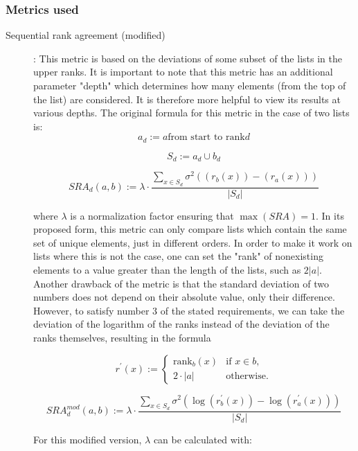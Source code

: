 \subsubsection{Metrics used}

\begin{description}
	\item [Sequential rank agreement (modified)] \cite{ekstromSequentialRankAgreement2015}: This metric is based on the deviations of some subset of the lists in the upper ranks.
	      It is important to note that this metric has an additional parameter "depth" which determines how many elements (from the top of the list) are considered.
	      It is therefore more helpful to view its results at various depths.
	      The original formula for this metric in the case of two lists is:
	      \[
		      a_{d} := a \text{from start to rank} d
	      \]

	      \[
		      S_{d} := a_{d} \cup b_{d}
	      \]

	      \[
		      SRA_{d}(a, b) := \lambda \cdot \frac{\sum_{x \in S_{d}} \sigma ^2 \left( \left( r_{b}(x) \right) - \left( r_{a}(x) \right) \right)}{|S_{d}|}
	      \]

	      where \(\lambda\) is a normalization factor ensuring that \(\max(SRA) = 1\).
	      In its proposed form, this metric can only compare lists which contain the same set of unique elements, just in different orders.
	      In order to make it work on lists where this is not the case, one can set the "rank" of nonexisting elements to a value greater than the length of the lists, such as \(2 |a|\).
	      Another drawback of the metric is that the standard deviation of two numbers does not depend on their absolute value, only their difference.
	      However, to satisfy number 3 of the stated requirements, we can take the deviation of the logarithm of the ranks instead of the deviation of the ranks themselves, resulting in the formula

	      \[
		      r^{\prime}(x) :=
		      \begin{cases}
			      \mathrm{rank}_{b}(x) & \text{if } x \in b, \\
			      2 \cdot |a|          & \text{otherwise.}
		      \end{cases}
	      \]

	      \[
		      SRA^{mod}_{d}(a, b) := \lambda \cdot \frac{\sum_{x \in S_{d}} \sigma ^2 \left( \log (r^{\prime}_{b}(x))-\log(r^{\prime}_{a}(x))\right)}{|S_{d}|}
	      \]

	      For this modified version, \(\lambda\) can be calculated with:


\end{description}
